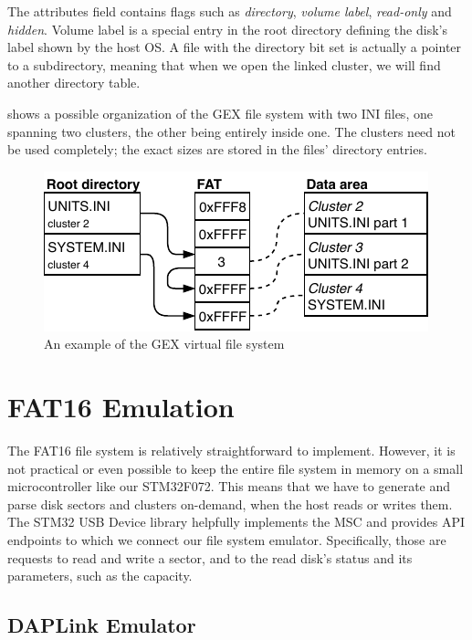 The attributes field contains flags such as \textit{directory}, \textit{volume label}, \textit{read-only} and \textit{hidden}. Volume label is a special entry in the root directory defining the disk's label shown by the host \gls{OS}. A file with the directory bit set is actually a pointer to a subdirectory, meaning that when we open the linked cluster, we will find another directory table.

 shows a possible organization of the GEX file system with two INI files, one spanning two clusters, the other being entirely inside one. The clusters need not be used completely; the exact sizes are stored in the files' directory entries.

\begin{figure}[h]
	\centering
	\includegraphics[scale=1.3] {img/fat-links.pdf}
	\caption{\label{fig:fat-example}An example of the GEX virtual file system}
\end{figure}


\section{FAT16 Emulation}

The FAT16 file system is relatively straightforward to implement. However, it is not practical or even possible to keep the entire file system in memory on a small microcontroller like our STM32F072. This means that we have to generate and parse disk sectors and clusters on-demand, when the host reads or writes them. The STM32 \gls{USB} Device library helpfully implements the \gls{MSC} and provides \gls{API} endpoints to which we connect our file system emulator. Specifically, those are requests to read and write a sector, and to the read disk's status and its parameters, such as the capacity.

\subsection{DAPLink Emulator}


